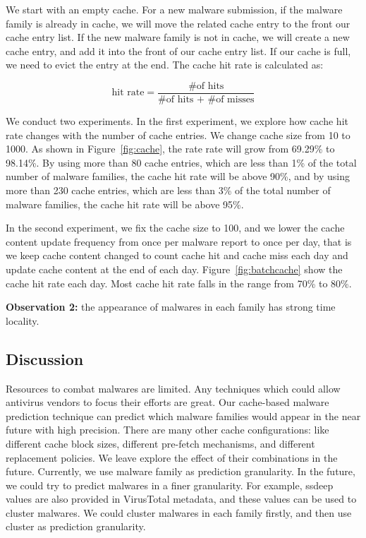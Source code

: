 We start with an empty cache. 
For a new malware submission, if the malware family is already in cache, 
we will move the related cache entry to the front our cache entry list. 
If the new malware family is not in cache, 
we will create a new cache entry, and add it into the front of our cache entry list. 
If our cache is full, we need to evict the entry at the end. 
The cache hit rate is calculated as: 

$$ \mbox{hit rate} = \dfrac{\mbox{\# of hits}}{\mbox{\# of hits + \# of misses}}$$



We conduct two experiments. In the first experiment, 
we explore how cache hit rate changes with the number of cache entries. 
We change cache size from 10 to 1000. As shown in Figure~\ref{fig:cache}, 
the rate rate will grow from 69.29\% to 98.14\%. 
By using more than 80 cache entries, which are less than 1\% of the total number of malware families, the cache hit rate will be above 90\%, 
and by using more than 230 cache entries, which are less than 3\% of the total number of malware families, 
the cache hit rate will be above 95\%. 

In the second experiment, we fix the cache size to 100, 
and we lower the cache content update frequency from once per malware report to once per day, 
that is we keep cache content changed to count cache hit and cache miss each day and update cache content at the end of each day.
Figure~\ref{fig:batchcache} show the cache hit rate each day. 
Most cache hit rate falls in the range from 70\% to 80\%.  


{\bf Observation 2:} 
the appearance of malwares in each family has strong time locality.  

\subsection{Discussion}
Resources to combat malwares are limited. 
Any techniques which could allow antivirus vendors to focus their efforts are great. 
Our cache-based malware prediction technique can predict which malware families would appear in the near future with high precision. 
There are many other cache configurations: 
like different cache block sizes, different pre-fetch mechanisms, 
and different replacement policies. We leave explore the effect of their combinations in the future. 
Currently, we use malware family as prediction granularity. 
In the future, we could try to predict malwares in a finer granularity. 
For example, ssdeep values are also provided in VirusTotal metadata, 
and these values can be used to cluster malwares. 
We could cluster malwares in each family firstly, and then use cluster as prediction granularity. 
